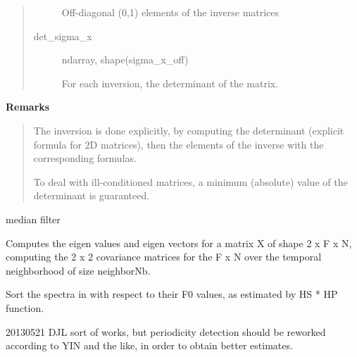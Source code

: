 \documentclass[letterpaper,10pt,english]{sphinxmanual}
\begin{document}
\begin{fulllineitems}
\begin{quote}
\begin{description}
Off-diagonal (0,1) elements of the inverse matrices

\item[{det\_sigma\_x}] \leavevmode
ndarray, shape(sigma\_x\_off)

For each inversion, the determinant of the matrix.

\end{description}
\end{quote}

\textbf{Remarks}
\begin{quote}

The inversion is done explicitly, by computing the determinant
(explicit formula for 2D matrices), then the elements of the
inverse with the corresponding formulas.

To deal with ill-conditioned matrices, a minimum (absolute) value of
the determinant is guaranteed.
\end{quote}

\end{fulllineitems}


\begin{fulllineitems}
\label{reference/tools:pyfasst.tools.signalTools.medianFilter}
median filter

\end{fulllineitems}


\begin{fulllineitems}
\label{reference/tools:pyfasst.tools.signalTools.prinComp2D}
Computes the eigen values and eigen vectors for a
matrix X of shape 2 x F x N, computing the 2 x 2 covariance matrices
for the F x N over the temporal neighborhood of size neighborNb.

\end{fulllineitems}


\begin{fulllineitems}
\label{reference/tools:pyfasst.tools.signalTools.sortSpectrum}
Sort the spectra in  with respect to their F0
values, as estimated by HS * HP function.

20130521 DJL sort of works, but periodicity detection should be reworked
according to YIN and the like, in order to obtain better estimates.

\end{fulllineitems}
\end{document}
